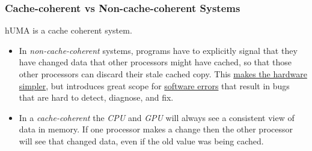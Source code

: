 \documentclass[12pt]{article}
\numberwithin{equation}{section}
\numberwithin{table}{section}
\numberwithin{figure}{section}
\begin{document}
\subsubsection*{Cache-coherent vs Non-cache-coherent Systems}
hUMA is a cache coherent system.
\begin{itemize}
	\item In \textit{non-cache-coherent} systems, programs have to explicitly signal that they have changed data that other processors might have cached, so that those other processors can discard their stale cached copy. This \underline{makes the hardware simpler}, but introduces great scope for \underline{software errors} that result in bugs that are hard to detect, diagnose, and fix.
	
	\item
	In a \textit{cache-coherent} the \textit{CPU} and \textit{GPU} will always see a consistent view of data in memory. If one processor makes a change then the other processor will see that changed data, even if the old value was being cached.\cite{hUMA}
\end{itemize}
\end{document}
